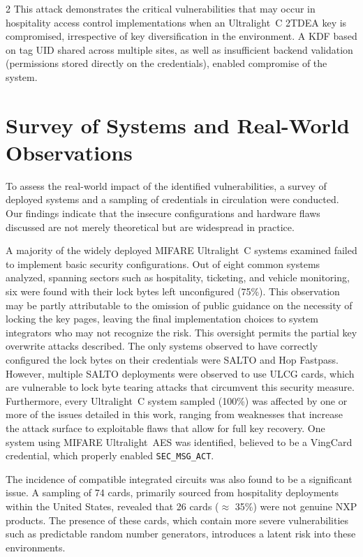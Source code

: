 \documentclass[10pt,letterpaper]{article}
\begin{document}
\begin{multicols}{2}
This attack demonstrates the critical vulnerabilities that may occur in hospitality access control implementations when an Ultralight~C 2TDEA key is compromised, irrespective of key diversification in the environment. A KDF based on tag UID shared across multiple sites, as well as insufficient backend validation (permissions stored directly on the credentials), enabled compromise of the system.

\section{Survey of Systems and Real-World Observations}
\label{sec:survey}
To assess the real-world impact of the identified vulnerabilities, a survey of deployed systems and a sampling of credentials in circulation were conducted. Our findings indicate that the insecure configurations and hardware flaws discussed are not merely theoretical but are widespread in practice.

A majority of the widely deployed MIFARE Ultralight~C systems examined failed to implement basic security configurations. Out of eight common systems analyzed, spanning sectors such as hospitality, ticketing, and vehicle monitoring, six were found with their lock bytes left unconfigured (75\%). This observation may be partly attributable to the omission of public guidance on the necessity of locking the key pages, leaving the final implementation choices to system integrators who may not recognize the risk. This oversight permits the partial key overwrite attacks described. The only systems observed to have correctly configured the lock bytes on their credentials were SALTO and Hop Fastpass. However, multiple SALTO deployments were observed to use ULCG cards, which are vulnerable to lock byte tearing attacks that circumvent this security measure. Furthermore, every Ultralight~C system sampled (100\%) was affected by one or more of the issues detailed in this work, ranging from weaknesses that increase the attack surface to exploitable flaws that allow for full key recovery. One system using MIFARE Ultralight~AES was identified, believed to be a VingCard credential, which properly enabled \texttt{SEC\_MSG\_ACT}.

The incidence of compatible integrated circuits was also found to be a significant issue. A sampling of 74 cards, primarily sourced from hospitality deployments within the United States, revealed that 26 cards ($\approx$ 35\%) were not genuine NXP products. The presence of these cards, which contain more severe vulnerabilities such as predictable random number generators, introduces a latent risk into these environments.


\end{multicols}
\end{document}
